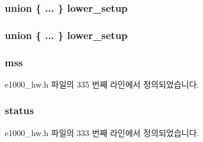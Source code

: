 \subsubsection[{\texorpdfstring{lower\+\_\+setup}{lower_setup}}]{\setlength{\rightskip}{0pt plus 5cm}union \{ ... \}   lower\+\_\+setup}\hypertarget{structe1000__context__desc_a70f0d905ef81d3101cfcf4aaa12e7efa}{}\label{structe1000__context__desc_a70f0d905ef81d3101cfcf4aaa12e7efa}
\subsubsection[{\texorpdfstring{lower\+\_\+setup}{lower_setup}}]{\setlength{\rightskip}{0pt plus 5cm}union \{ ... \}   lower\+\_\+setup}\hypertarget{structe1000__context__desc_a9015a1f4d46cee81644ef414c4c1f442}{}\label{structe1000__context__desc_a9015a1f4d46cee81644ef414c4c1f442}
\subsubsection[{\texorpdfstring{mss}{mss}}]{ mss}\hypertarget{structe1000__context__desc_a22ed26a3c6d50ec865041c8c8f963e34}{}\label{structe1000__context__desc_a22ed26a3c6d50ec865041c8c8f963e34}


e1000\+\_\+hw.\+h 파일의 335 번째 라인에서 정의되었습니다.

\subsubsection[{\texorpdfstring{status}{status}}]{ status}\hypertarget{structe1000__context__desc_aa648386576736be0dd25c95b6edd37d2}{}\label{structe1000__context__desc_aa648386576736be0dd25c95b6edd37d2}


e1000\+\_\+hw.\+h 파일의 333 번째 라인에서 정의되었습니다.

